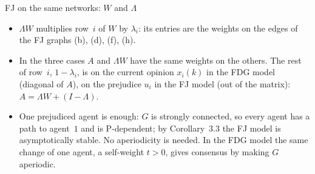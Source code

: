 \documentclass[10pt, aspectratio=169]{beamer}
\begin{document}
\begin{frame}[label=m-fj-matrices]{FJ on the same networks: $W$ and $\Lambda$}
  \smallskip
  \footnotesize
  \begin{itemize}
    \setlength{\itemsep}{1pt}
    \item $\Lambda W$ multiplies row~$i$ of $W$ by $\lambda_i$: its entries are the weights
          on the edges of the FJ graphs (b), (d), (f), (h).
    \item In the three cases $A$ and $\Lambda W$ have the same weights on the others. The rest of row~$i$,
          $1 - \lambda_i$, is on the current opinion $x_i(k)$ in the FDG model (diagonal of
          $A$), on the prejudice $u_i$ in the FJ model (out of the matrix):
          $A = \Lambda W + (I - \Lambda)$.
    \item \alert{One prejudiced agent is enough}: $G$ is strongly connected, so every agent
          has a path to agent~$1$ and is P-dependent; by Corollary~3.3 the FJ model is
          asymptotically stable. No aperiodicity is needed. In the FDG model the same
          change of one agent, a self-weight $t > 0$, gives consensus by making $G$
          aperiodic.
  \end{itemize}
\end{frame}
\end{document}
